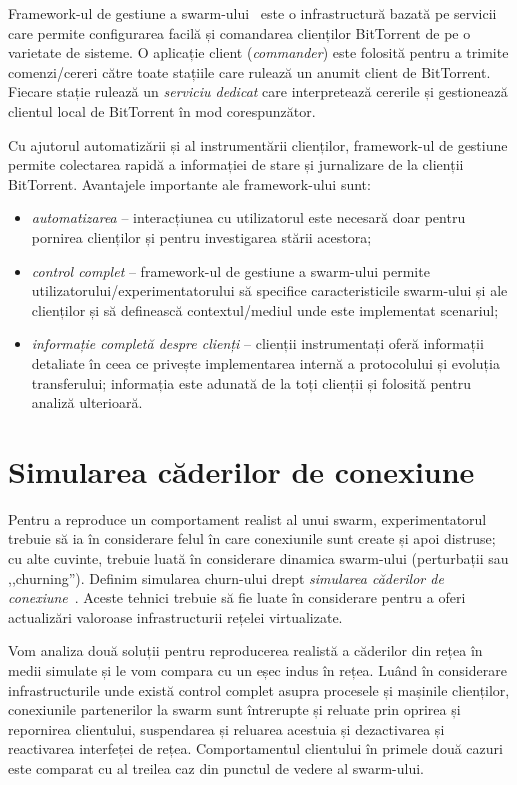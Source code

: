 Framework-ul de gestiune a swarm-ului~\cite{swarm-management}
este o infrastructură bazată pe servicii care permite configurarea facilă
și comandarea clienților BitTorrent de pe o varietate de sisteme. O aplicație
client (\textit{commander}) este folosită pentru a trimite comenzi/cereri
către toate stațiile care rulează un anumit client de BitTorrent. Fiecare
stație rulează un \textit{serviciu dedicat} care interpretează cererile
și gestionează clientul local de BitTorrent în mod corespunzător.

Cu ajutorul automatizării și al instrumentării clienților, framework-ul
de gestiune permite colectarea rapidă a informației de stare și jurnalizare
de la clienții BitTorrent. Avantajele importante ale framework-ului sunt:

\begin{itemize}
  \item \textit{automatizarea} -- interacțiunea cu utilizatorul este
  necesară doar pentru pornirea clienților și pentru investigarea stării
  acestora;
  \item \textit{control complet} -- framework-ul de gestiune a swarm-ului
  permite utilizatorului/experimentatorului să specifice caracteristicile
  swarm-ului și ale clienților și să definească contextul/mediul unde
  este implementat scenariul;
  \item \textit{informație completă despre clienți} -- clienții instrumentați
  oferă informații detaliate în ceea ce privește implementarea internă a
  protocolului și evoluția transferului; informația este adunată de la
  toți clienții și folosită pentru analiză ulterioară.
\end{itemize}

\section{Simularea căderilor de conexiune}
\label{sec:virt-infra:dropouts}

Pentru a reproduce un comportament realist al unui swarm, experimentatorul
trebuie să ia în considerare felul în care conexiunile sunt create și
apoi distruse; cu alte cuvinte, trebuie luată în considerare dinamica
swarm-ului (perturbații sau ,,churning''). Definim simularea churn-ului
drept \textit{simularea căderilor de conexiune}~\cite{simulating-dropouts}.
Aceste tehnici trebuie să fie luate în considerare pentru a oferi actualizări
valoroase infrastructurii rețelei virtualizate.

Vom analiza două soluții pentru reproducerea realistă a căderilor din rețea
în medii simulate și le vom compara cu un eșec indus în rețea. Luând în
considerare infrastructurile unde există control complet asupra procesele
și mașinile clienților, conexiunile partenerilor la swarm sunt întrerupte
și reluate prin oprirea și repornirea clientului, suspendarea și reluarea
acestuia și dezactivarea și reactivarea interfeței de rețea. Comportamentul
clientului în primele două cazuri este comparat cu al treilea caz din
punctul de vedere al swarm-ului.

